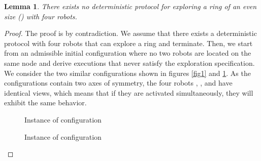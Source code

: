 \documentclass[12pt]{llncs}
\newtheorem{lem}{Lemma}
\begin{document}
\begin{lem}There exists no deterministic protocol for exploring a ring of an even size () with four robots.
\end{lem}

\begin{proof}
The proof is by contradiction. We assume that there exists a deterministic protocol with four robots that can explore a ring and terminate. Then, we start from an admissible initial configuration where no two robots are located on the same node and derive executions that never satisfy the exploration specification.\\

We consider the two similar configurations shown in figures \ref{fig1} and \ref{fig2}. As the configurations contain two axes of symmetry, the four robots , ,  and  have identical views, which means that if they are activated simultaneously, they will exhibit the same behavior. 

\begin{figure}
 \begin{minipage}[b]{.46\linewidth}
  \centering{}
  \caption{Instance of configuration \label{fig1}}
 \end{minipage} \hfill
 \begin{minipage}[b]{.46\linewidth}
  \centering{}
  \caption{Instance of configuration  \label{fig2}}
 \end{minipage}
\end{figure}


\end{proof}
\end{document}
